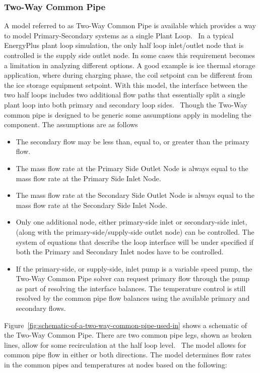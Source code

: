 \subsubsection{Two-Way Common Pipe}\label{two-way-common-pipe}

A model referred to as Two-Way Common Pipe is available which provides a way to model Primary-Secondary systems as a single Plant Loop.~ In a typical EnergyPlus plant loop simulation, the only half loop inlet/outlet node that is controlled is the supply side outlet node. In some cases this requirement becomes a limitation in analyzing different options. A good example is ice thermal storage application, where during charging phase, the coil setpoint can be different from the ice storage equipment setpoint. With this model, the interface between the two half loops includes two additional flow paths that essentially split a single plant loop into both primary and secondary loop sides.~ Though the Two-Way common pipe is designed to be generic some assumptions apply in modeling the component. The assumptions are as follows

\begin{itemize}
\item
  The secondary flow may be less than, equal to, or greater than the primary flow.
\item
  The mass flow rate at the Primary Side Outlet Node is always equal to the mass flow rate at the Primary Side Inlet Node.
\item
  The mass flow rate at the Secondary Side Outlet Node is always equal to the mass flow rate at the Secondary Side Inlet Node.
\item
  Only one additional node, either primary-side inlet or secondary-side inlet, (along with the primary-side/supply-side outlet node) can be controlled. The system of equations that describe the loop interface will be under specified if both the Primary and Secondary Inlet nodes have to be controlled.
\item
  If the primary-side, or supply-side, inlet pump is a variable speed pump, the Two-Way Common Pipe solver can request primary flow through the pump as part of resolving the interface balances. The temperature control is still resolved by the common pipe flow balances using the available primary and secondary flows.
\end{itemize}

Figure~\ref{fig:schematic-of-a-two-way-common-pipe-used-in} shows a schematic of the Two-Way Common Pipe. There are two common pipe legs, shown as broken lines, allow for some recirculation at the half loop level.~ The model allows for common pipe flow in either or both directions. The model determines flow rates in the common pipes and temperatures at nodes based on the following:

